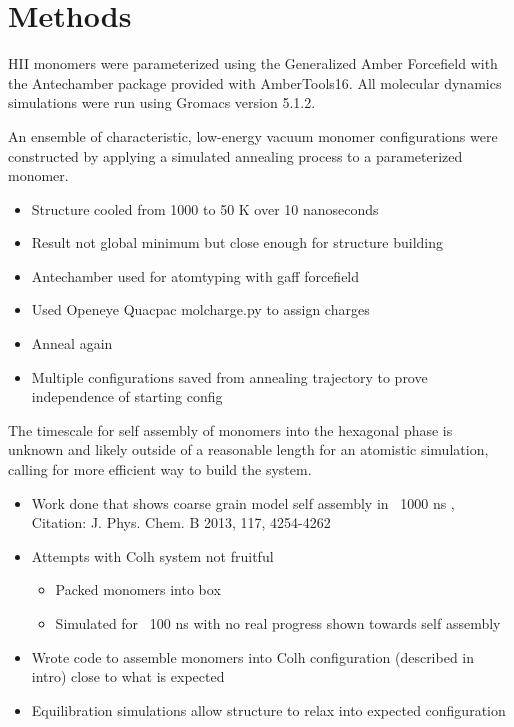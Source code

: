 \documentclass{article}
\begin{document}
	\section{Methods}
	
	HII monomers were parameterized using the Generalized Amber Forcefield with the Antechamber package provided with AmberTools16. All molecular dynamics simulations were run using Gromacs version 5.1.2.
	
	An ensemble of characteristic, low-energy vacuum monomer configurations were constructed by applying a simulated annealing process to a parameterized monomer.
	\begin{itemize}
		\item Structure cooled from 1000 to 50 K over 10 nanoseconds
		\item Result not global minimum but close enough for structure building
		\item Antechamber used for atomtyping with gaff forcefield
		\item Used Openeye Quacpac molcharge.py to assign charges
		\item Anneal again 
		\item Multiple configurations saved from annealing trajectory to prove independence of starting config
	\end{itemize}
	
	The timescale for self assembly of monomers into the hexagonal phase is unknown and likely outside of a reasonable length for an atomistic simulation, calling for more efficient way to build the system. 
	\begin{itemize}
		\item Work done that shows coarse grain model self assembly in ~1000 ns , Citation: J. Phys. Chem. B 2013, 117, 4254-4262
		\item Attempts with Colh system not fruitful  
		\begin{itemize}
			\item Packed monomers into box
			\item Simulated for ~100 ns with no real progress shown towards self assembly
		\end{itemize}  
		\item Wrote code to assemble monomers into Colh configuration (described in intro) close to what is expected 
		\item Equilibration simulations allow structure to relax into expected configuration 
	\end{itemize}
	
\end{document}
